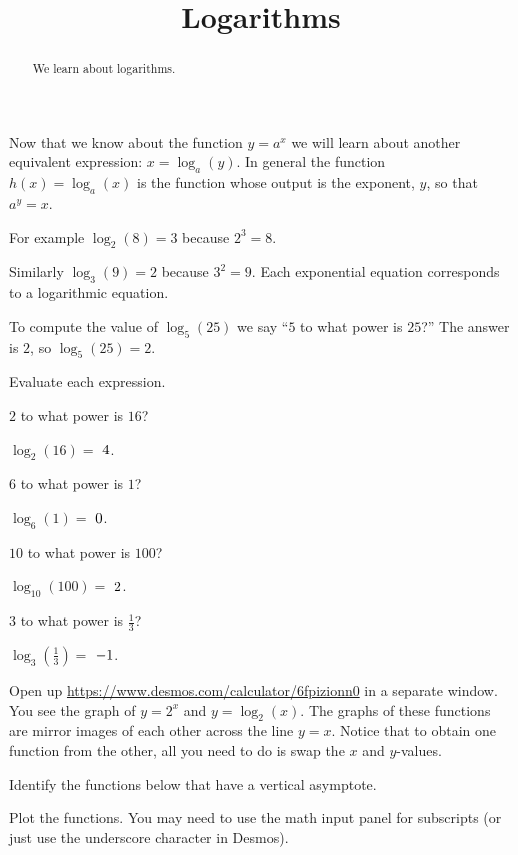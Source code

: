 \documentclass{ximera}
\title{Logarithms}
\begin{document}
\begin{abstract}
We learn about logarithms.
\end{abstract}
\maketitle

Now that we know about the function $y=a^x$ we will learn about another equivalent expression: $x=\log_a(y)$. In general the function $h(x)=\log_a(x)$ is the function whose output is the exponent, $y$, so that $a^y=x$.

For example $\log_2(8)=3$ because $2^3=8$. 

Similarly $\log_3(9)=2$ because $3^2=9$. Each exponential equation corresponds to a logarithmic equation. 

To compute the value of $\log_5(25)$ we say ``$5$ to what power is $25$?'' The answer is $2$, so $\log_5(25)=2$.

\begin{question}
Evaluate each expression.
\begin{solution}
\begin{hint}
$2$ to what power is $16$? 
\end{hint}
$\log_2(16)=$ ${4}$.
\begin{hint}
$6$ to what power is $1$? 
\end{hint}
$\log_6(1)=$ ${0}$.
\begin{hint}
$10$ to what power is $100$? 
\end{hint}
$\log_{10}(100)=$ ${2}$.
\begin{hint}
$3$ to what power is $\frac{1}{3}$? 
\end{hint}
$\log_{3}\left(\frac{1}{3}\right)=$ ${-1}$.
\end{solution}
\end{question}



Open up \url{https://www.desmos.com/calculator/6fpizionn0} in a separate window. You see the graph of $y=2^x$ and $y=\log_2(x)$. The graphs of these functions are mirror images of each other across the line $y=x$. Notice that to obtain one function from the other, all you need to do is swap the $x$ and $y$-values. 

\begin{question}
Identify the functions below that have a vertical asymptote.
  \begin{solution}
    \begin{hint}
      Plot the functions. You may need to use the math input panel for subscripts (or just use the underscore character in Desmos).
    \end{hint}
    \begin{multiple-choice}
    \end{multiple-choice}
  \end{solution}
\end{question}
\end{document}
